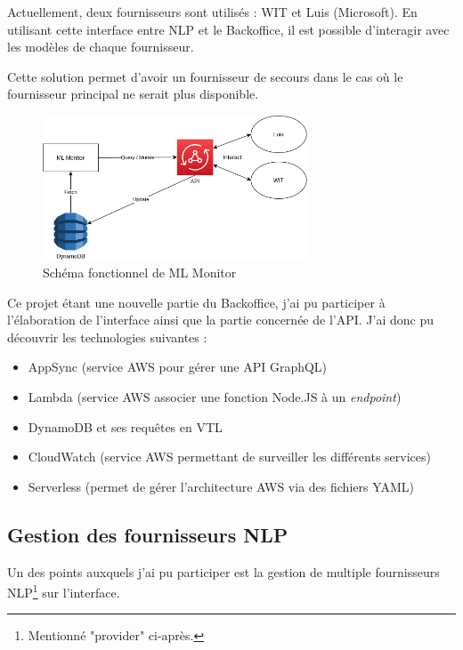 \documentclass[12pt,a4paper,oneside]{scrreprt}
\begin{document}
Actuellement, deux fournisseurs sont utilisés : WIT et Luis (Microsoft). En utilisant cette interface entre NLP et le Backoffice, il est possible d'interagir avec les modèles de chaque fournisseur.

Cette solution permet d'avoir un fournisseur de secours dans le cas où le fournisseur principal ne serait plus disponible.

\begin{figure}[!ht]
	\centering
	\includegraphics[width=0.7\textwidth]{pictures/diagram_mlmonitor.png}
	\caption{Schéma fonctionnel de ML Monitor}
\end{figure}

\begin{info}
	Ce projet étant une nouvelle partie du Backoffice, j'ai pu participer à l'élaboration de l'interface ainsi que la partie concernée de l'API. J'ai donc pu découvrir les technologies suivantes :
	\begin{itemize}
		\item AppSync (service AWS pour gérer une API GraphQL)
		\item Lambda (service AWS associer une fonction Node.JS à un \textit{endpoint})
		\item DynamoDB et ses requêtes en VTL
		\item CloudWatch (service AWS permettant de surveiller les différents services)
		\item Serverless (permet de gérer l'architecture AWS via des fichiers YAML)
	\end{itemize}
\end{info}

\subsection{Gestion des fournisseurs NLP}

Un des points auxquels j'ai pu participer est la gestion de multiple fournisseurs NLP\footnote{Mentionné "provider" ci-après.} sur l'interface.
\end{document}
